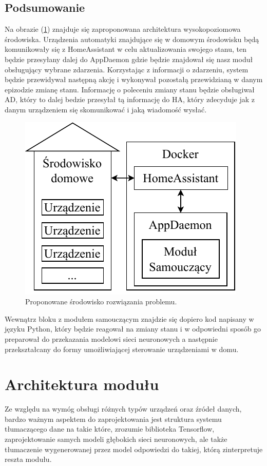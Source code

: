 \subsection{Podsumowanie}
Na obrazie (\ref{fig:architektura}) znajduje się zaproponowana architektura wysokopoziomowa środowiska. Urządzenia automatyki znajdujące się w  domowym środowisku będą komunikowały się z HomeAssistant w celu aktualizowania swojego stanu, ten będzie przesyłany dalej do AppDaemon gdzie będzie znajdował się nasz moduł obsługujący wybrane zdarzenia. Korzystając z informacji o zdarzeniu, system będzie przewidywał następną akcję i wykonywał pozostałą przewidzianą w danym epizodzie zmianę stanu. Informację o poleceniu zmiany stanu będzie obsługiwał AD, który to dalej bedzie przesyłał tą informację do HA, który zdecyduje jak z danym urządzeniem się skomunikować i jaką wiadomość wysłać. 

\begin{figure}
    \centering\includegraphics[width=.45\textwidth]{img/architecture.pdf}
    \caption{Proponowane środowisko rozwiązania problemu.} \label{fig:architektura}
\end{figure}

Wewnątrz bloku z modułem samouczącym znajdzie się dopiero kod napisany w języku Python, który będzie reagował na zmiany stanu i w odpowiedni sposób go preparował do przekazania modelowi sieci neuronowych a następnie przekształcany do formy umożliwiającej sterowanie urządzeniami w domu.

\section{Architektura modułu}
Ze względu na wymóg obsługi różnych typów urządzeń oraz źródeł danych, bardzo ważnym aspektem do zaprojektowania jest struktura systemu tłumaczącego dane na takie które, zrozumie biblioteka Tensorflow, zaprojektowanie samych modeli głębokich sieci neuronowych, ale także tłumaczenie wygenerowanej przez model odpowiedzi do takiej, którą zinterpretuje reszta modułu.

